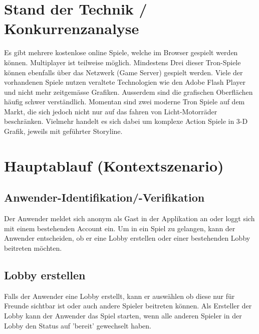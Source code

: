 \documentclass[11pt,ngerman]{article}
\begin{document}
    \section{Stand der Technik / Konkurrenzanalyse}
    Es gibt mehrere kostenlose online Spiele, welche im Browser gespielt werden können. \Gls{Multiplayer} ist teilweise möglich. Mindestens Drei dieser Tron-Spiele können ebenfalls über das Netzwerk (\Gls{Game Server}) gespielt werden. \cite{TronGameBasisKostenlosOnline}\cite{sphinxCyclewarsIoOnline}\cite{TronLightCyclesEu}\cite{PlayersOnlineXtremeTron}
    Viele der vorhandenen Spiele nutzen veraltete Technologien wie den \Gls{Adobe Flash Player} \cite{SayingGoodbyeFlash2017}\cite{FlashFutureInteractive2017} und nicht mehr zeitgemässe Grafiken. Ausserdem sind die grafischen Oberflächen häufig schwer verständlich.
    Momentan sind zwei moderne Tron Spiele auf dem Markt, die sich jedoch nicht nur auf das fahren von Licht-Motorräder beschränken. Vielmehr handelt es sich dabei um komplexe Action Spiele in 3-D Grafik, jeweils mit geführter Storyline.\cite{TronEvolution2020}\cite{TRONRUNr}

    \section{Hauptablauf (Kontextszenario)}

    \subsection{Anwender-Identifikation/-Verifikation}
	Der Anwender meldet sich anonym als Gast in der Applikation an oder loggt sich mit einem bestehenden Account ein. Um in ein Spiel zu gelangen, kann der Anwender entscheiden, ob er eine Lobby erstellen oder einer bestehenden Lobby beitreten möchten.

	\subsection{\Gls{Lobby} erstellen}
	Falls der Anwender eine Lobby erstellt, kann er auswählen ob diese nur für Freunde sichtbar ist oder auch andere Spieler beitreten können. Als Ersteller der Lobby kann der Anwender das Spiel starten, wenn alle anderen Spieler in der Lobby den Status auf 'bereit' gewechselt haben.
\end{document}
